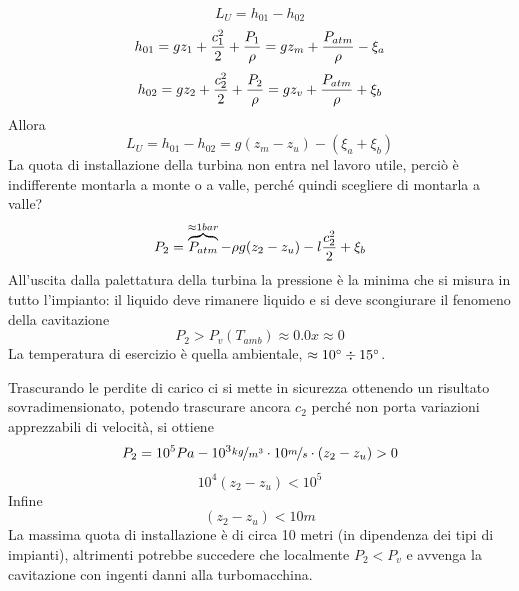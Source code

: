 \documentclass[a4paper, 15pt]{article}
\begin{document}
\begin{adjustwidth}{2in}{}
	\[L_U = h_{01} - h_{02}\]
	\[h_{01} = gz_1 + {c_1^2\over2} + {P_1\over\rho} = gz_m + {P_{atm}\over\rho} - \xi_a\]
	\[h_{02} = gz_2 + {c_2^2\over2} + {P_2\over\rho} = gz_v + {P_{atm}\over\rho} + \xi_b\]
	Allora 
	\[L_U = h_{01} - h_{02} = g(z_m-z_u) - (\xi_a+\xi_b)\]
	La quota di installazione della turbina non entra nel lavoro utile, perciò è indifferente montarla a monte o a valle, perché quindi scegliere di montarla a valle? 
	\[P_2 = \overbrace{P_{atm}}^{\approx 1 bar} - \rho g(z_2-z_u) - l{c_2^2\over2} + \xi_b\]
	All'uscita dalla palettatura della turbina la pressione è la minima che si misura in tutto l'impianto: il liquido deve rimanere liquido e si deve scongiurare il fenomeno della cavitazione
	\[P_2>P_v(T_{amb}) \approx 0.0x \approx 0\]
	La temperatura di esercizio è quella ambientale, $\approx 10\degree\div15\degree$. 
	
	Trascurando le perdite di carico ci si mette in sicurezza ottenendo un risultato sovradimensionato, potendo trascurare ancora $c_2$ perché non porta variazioni apprezzabili di velocità, si ottiene
	\[P_2 = 10^5 Pa - 10^3 \nicefrac{kg}{m^3}\cdot10 \nicefrac{m}{s}\cdot(z_2-z_u) > 0 \] 
	\[10^4(z_2-z_u) < 10^5 \]
	Infine 
	\[(z_2-z_u) < 10 m\]
	La massima quota di installazione è di circa 10 metri (in dipendenza dei tipi di impianti), altrimenti potrebbe succedere che localmente $P_2<P_v$ e avvenga la cavitazione con ingenti danni alla turbomacchina. 
\end{adjustwidth}
\end{document}
